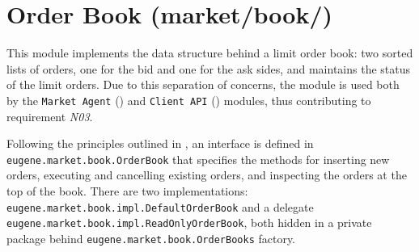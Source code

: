\section{Order Book (market/book/)}
This module implements the data structure behind a limit order book: two sorted lists of orders, one for the bid and one for the ask sides, and maintains the status of the limit orders. Due to this separation of concerns, the module is used both by the \texttt{Market~Agent} () and \texttt{Client~API} () modules, thus contributing to requirement \textit{N03}.

Following the principles outlined in , an interface is defined in \\ \texttt{eugene.market.book.OrderBook} that specifies the methods for inserting new orders, executing and cancelling existing orders, and inspecting the orders at the top of the book. There are two implementations: \texttt{eugene.market.book.impl.DefaultOrderBook} and a delegate \texttt{eugene.market.book.impl.ReadOnlyOrderBook}, both hidden in a private package behind \texttt{eugene.market.book.OrderBooks} factory.  
